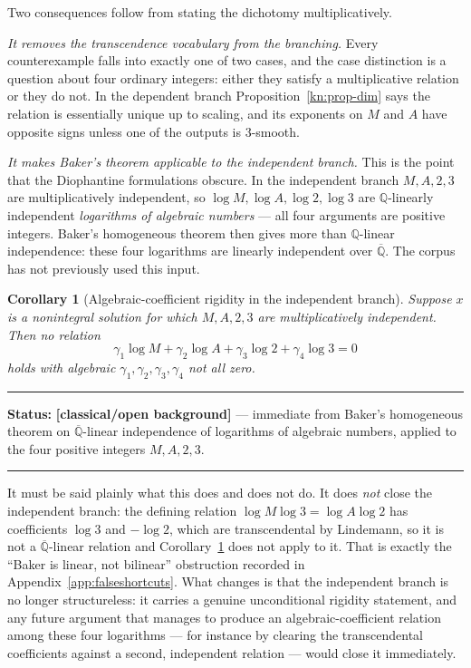 \documentclass[11pt,oneside]{article}
\newtheorem{corollary}[theorem]{Corollary}
\theoremstyle{definition}
\theoremstyle{remark}
\newcommand{\Q}{\mathbb Q}
\newcommand{\Abar}{\overline{\mathbb Q}}
\newcommand{\Qbar}{\Abar}
\newcommand{\statusknown}{\textcolor{classicalgray}{\textbf{[classical/open background]}}}
\newenvironment{statusbox}[1]
{\begin{center}\begin{minipage}{0.94\textwidth}\raggedright\hbadness=10000\hrule
\vspace{0.45em}\textbf{Status:} #1\par\vspace{0.35em}}
{\vspace{0.35em}\hrule\end{minipage}\end{center}}
\begin{document}
Two consequences follow from stating the dichotomy multiplicatively.

\emph{It removes the transcendence vocabulary from the branching.}  Every counterexample
falls into exactly one of two cases, and the case distinction is a question about four
ordinary integers: either they satisfy a multiplicative relation or they do not.  In the
dependent branch Proposition~\ref{kn:prop-dim} says the relation is essentially unique up to
scaling, and its exponents on $M$ and $A$ have opposite signs unless one of the outputs is
$3$-smooth.

\emph{It makes Baker's theorem applicable to the independent branch.}  This is the point that
the Diophantine formulations obscure.  In the independent branch $M,A,2,3$ are
multiplicatively independent, so $\log M,\log A,\log2,\log3$ are $\Q$-linearly independent
\emph{logarithms of algebraic numbers} --- all four arguments are positive integers.  Baker's
homogeneous theorem then gives more than $\Q$-linear independence: these four logarithms are
linearly independent over $\Qbar$.  The corpus has not previously used this input.

\begin{corollary}[Algebraic-coefficient rigidity in the independent branch]
\label{kn:cor-baker}
Suppose $x$ is a nonintegral solution for which $M,A,2,3$ are multiplicatively independent.
Then no relation
\[
  \gamma_1\log M+\gamma_2\log A+\gamma_3\log2+\gamma_4\log3=0
\]
holds with algebraic $\gamma_1,\gamma_2,\gamma_3,\gamma_4$ not all zero.
\end{corollary}

\begin{statusbox}{\statusknown{} --- immediate from Baker's homogeneous theorem on
$\Qbar$-linear independence of logarithms of algebraic numbers, applied to the four positive
integers $M,A,2,3$.}
\end{statusbox}

It must be said plainly what this does and does not do.  It does \emph{not} close the
independent branch: the defining relation $\log M\log3=\log A\log2$ has coefficients $\log3$
and $-\log2$, which are transcendental by Lindemann, so it is not a $\Qbar$-linear relation
and Corollary~\ref{kn:cor-baker} does not apply to it.  That is exactly the ``Baker is linear,
not bilinear'' obstruction recorded in Appendix~\ref{app:falseshortcuts}.  What changes is
that the independent branch is no longer structureless: it carries a genuine unconditional
rigidity statement, and any future argument that manages to produce an algebraic-coefficient
relation among these four logarithms --- for instance by clearing the transcendental
coefficients against a second, independent relation --- would close it immediately.
\end{document}
